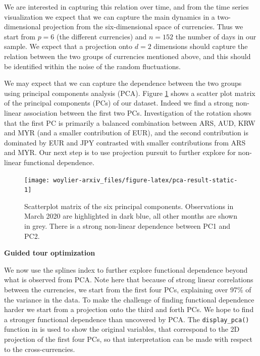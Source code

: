 \documentclass{article}
\begin{document}
We are interested in capturing this relation over time, and from the
time series visualization we expect that we can capture the main
dynamics in a two-dimensional projection from the six-dimensional space
of currencies. Thus we start from \(p=6\) (the different currencies) and
\(n=152\) the number of days in our sample. We expect that a projection
onto \(d=2\) dimensions should capture the relation between the two
groups of currencies mentioned above, and this should be identified
within the noise of the random fluctuations.

We may expect that we can capture the dependence between the two groups
using principal components analysis (PCA). Figure
\ref{fig:pca-result-static} shows a scatter plot matrix of the principal
components (PCs) of our dataset. Indeed we find a strong non-linear
association between the first two PCs. Investigation of the rotation
shows that the first PC is primarily a balanced combination between ARS,
AUD, KRW and MYR (and a smaller contribution of EUR), and the second
contribution is dominated by EUR and JPY contrasted with smaller
contributions from ARS and MYR. Our next step is to use projection
pursuit to further explore for non-linear functional dependence.

\begin{figure}

{\centering \texttt{[image: woylier-arxiv\_files/figure-latex/pca-result-static-1]} 

}

\caption{Scatterplot matrix of the six principal components. Observations in March 2020 are highlighted in dark blue, all other months are shown in grey. There is a strong non-linear dependence between PC1 and PC2.}\label{fig:pca-result-static}
\end{figure}

\textbf{Guided tour optimization}

We now use the splines index to further explore functional dependence
beyond what is observed from PCA. Note here that because of strong
linear correlations between the currencies, we start from the first four
PCs, explaining over 97\% of the variance in the data. To make the
challenge of finding functional dependence harder we start from a
projection onto the third and forth PCs. We hope to find a stronger
functional dependence than uncovered by PCA. The \texttt{display\_pca()}
function in  is used to show the original variables, that
correspond to the 2D projection of the first four PCs, so that
interpretation can be made with respect to the cross-currencies.
\end{document}
